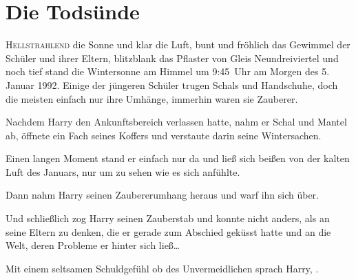 \chapter{Die Todsünde}

\lettrine{H}{ellstrahlend} die Sonne und klar die Luft, bunt und fröhlich das Gewimmel der Schüler und ihrer Eltern, blitzblank das Pflaster von Gleis Neundreiviertel und noch tief stand die Wintersonne am Himmel um 9:45~Uhr am Morgen des 5. Januar 1992. Einige der jüngeren Schüler trugen Schals und Handschuhe, doch die meisten einfach nur ihre Umhänge, immerhin waren sie Zauberer.

Nachdem Harry den Ankunftsbereich verlassen hatte, nahm er Schal und Mantel ab, öffnete ein Fach seines Koffers und verstaute darin seine Wintersachen.

Einen langen Moment stand er einfach nur da und ließ sich beißen von der kalten Luft des Januars, nur um zu sehen wie es sich anfühlte.

Dann nahm Harry seinen Zaubererumhang heraus und warf ihn sich über.

Und schließlich zog Harry seinen Zauberstab und konnte nicht anders, als an seine Eltern zu denken, die er gerade zum Abschied geküsst hatte und an die Welt, deren Probleme er hinter sich ließ…

Mit einem seltsamen Schuldgefühl ob des Unvermeidlichen sprach Harry, .

